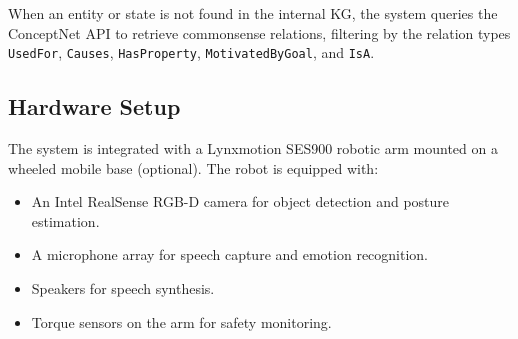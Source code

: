 When an entity or state is not found in the internal KG, the system queries the ConceptNet API to retrieve commonsense relations, filtering by the relation types \texttt{UsedFor}, \texttt{Causes}, \texttt{HasProperty}, \texttt{MotivatedByGoal}, and \texttt{IsA}.

\subsection{Hardware Setup}

The system is integrated with a Lynxmotion SES900 robotic arm mounted on a wheeled mobile base (optional). The robot is equipped with:
\begin{itemize}
\item An Intel RealSense RGB-D camera for object detection and posture estimation.
\item A microphone array for speech capture and emotion recognition.
\item Speakers for speech synthesis.
\item Torque sensors on the arm for safety monitoring.
\end{itemize}
